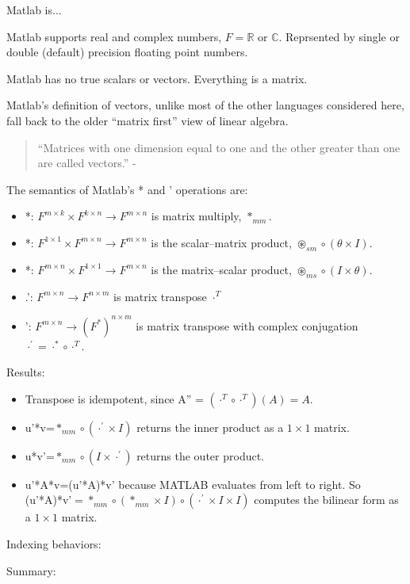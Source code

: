 Matlab is...

Matlab supports real and complex numbers, $F=\mathbb{R}$ or $\mathbb{C}$.
Reprsented by single or double (default) precision floating point
numbers.

Matlab has no true scalars or vectors. Everything is a matrix.

Matlab's definition of vectors, unlike most of the other languages
considered here, fall back to the older ``matrix first'' view of
linear algebra.
\begin{quotation}
``Matrices with one dimension equal to one and the other greater
than one are called vectors.'' - \cite{matlab-empty-mat}
\end{quotation}
The semantics of Matlab's {*} and ' operations are:
\begin{itemize}
\item {*}: $F^{m\times k}\times F^{k\times n}\rightarrow F^{m\times n}$
is matrix multiply, $*_{mm}$.
\item {*}: $F^{1\times1}\times F^{m\times n}\rightarrow F^{m\times n}$
is the scalar–matrix product, $\circledast_{sm}\circ\left(\theta\times I\right)$.
\item {*}: $F^{m\times n}\times F^{1\times1}\rightarrow F^{m\times n}$
is the matrix–scalar product, $\circledast_{ms}\circ\left(I\times\theta\right)$.
\item .': $F^{m\times n}\rightarrow F^{n\times m}$ is matrix transpose
$\cdot^{T}$
\item ': $F^{m\times n}\rightarrow\left(F^{*}\right)^{n\times m}$ is matrix
transpose with complex conjugation $\cdot^{\prime}=\cdot^{*}\circ\cdot^{T}$.
\end{itemize}
Results:
\begin{itemize}
\item Transpose is idempotent, since A'' = $\left(\cdot^{T}\circ\cdot^{T}\right)(A)=A$.
\item u'{*}v=$*_{mm}\circ\left(\cdot^{\prime}\times I\right)$ returns the
inner product as a $1\times1$ matrix.
\item u{*}v'=$*_{mm}\circ\left(I\times\cdot^{\prime}\right)$ returns the
outer product.
\item u'{*}A{*}v=(u'{*}A){*}v' because MATLAB evaluates from left to right.
So (u'{*}A){*}v'$=*_{mm}\circ\left(*_{mm}\times I\right)\circ\left(\cdot^{\prime}\times I\times I\right)$
computes the bilinear form as a $1\times1$ matrix.
\end{itemize}
Indexing behaviors:

Summary:

